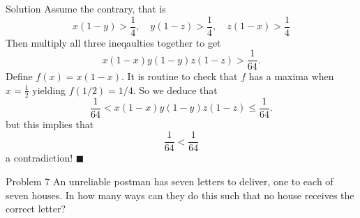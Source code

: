 \documentclass{article}
\begin{document}
\begin{solution}{Solution}
Assume the contrary, that is
$$
x(1-y) > \frac14, \quad y(1-z) > \frac14, \quad z(1-x) > \frac14
$$
Then multiply all three ineqaulties together to get
$$
x(1-x)y(1-y)z(1-z) > \frac{1}{64}.
$$
Define $f(x) = x(1-x)$. It is routine to check that $f$ has a maxima
when $x=\frac12$ yielding $f(1/2) = 1/4$. So we deduce that
$$
\frac{1}{64} < x(1-x)y(1-y)z(1-z) \leq \frac{1}{64}.
$$
but this implies that
$$
\frac{1}{64} < \frac{1}{64}
$$
a contradiction! $\blacksquare$
\end{solution}
\newpage

\begin{problem}{Problem 7}
An unreliable postman has seven letters to deliver, one to each of seven
houses. In how many ways can they do this such that no house receives the
correct letter?
\end{problem}
\end{document}
